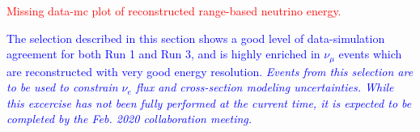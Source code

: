 \textcolor{red}{Missing data-mc plot of reconstructed range-based neutrino energy.}

\textcolor{blue}{The selection described in this section shows a good level of data-simulation agreement for both Run 1 and Run 3, and is highly enriched in $\nu_{\mu}$ events which are reconstructed with very good energy resolution. \emph{Events from this selection are to be used to constrain $\nu_e$ flux and cross-section modeling uncertainties. While this excercise has not been fully performed at the current time, it is expected to be completed by the Feb. 2020 collaboration meeting.}}
